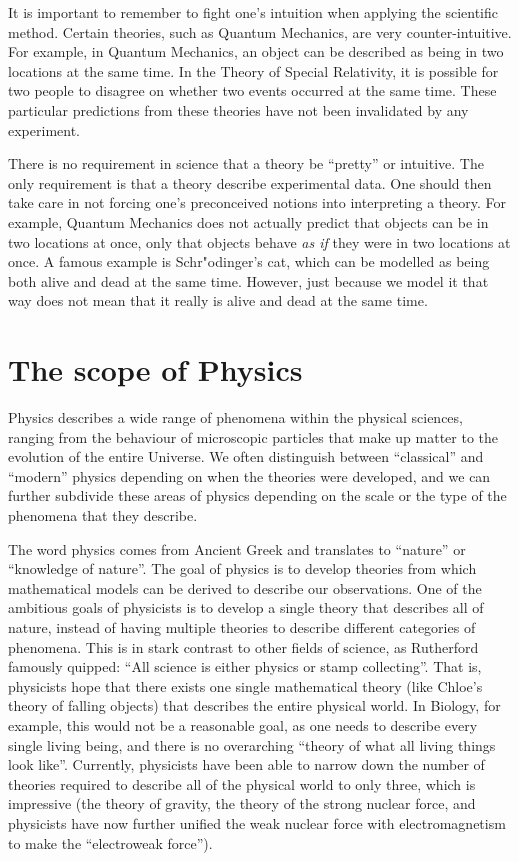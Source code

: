 \documentclass[9pt,Preprint]{lapreprint}
\begin{document}
It is important to remember to fight one's intuition when applying the scientific method. Certain theories, such as Quantum Mechanics, are very counter-intuitive. For example, in Quantum Mechanics, an object can be described as being in two locations at the same time. In the Theory of Special Relativity, it is possible for two people to disagree on whether two events occurred at the same time. These particular predictions from these theories have not been invalidated by any experiment.

There is no requirement in science that a theory be ``pretty'' or intuitive. The only requirement is that a theory describe experimental data. One should then take care in not forcing one's preconceived notions into interpreting a theory. For example, Quantum Mechanics does not actually predict that objects can be in two locations at once, only that objects behave \textit{as if} they were in two locations at once. A famous example is Schr"odinger's cat, which can be modelled as being both alive and dead at the same time. However, just because we model it that way does not mean that it really is alive and dead at the same time.

\section{The scope of Physics}

Physics describes a wide range of phenomena within the physical sciences, ranging from the behaviour of microscopic particles that make up matter to the evolution of the entire Universe. We often distinguish between ``classical'' and ``modern'' physics depending on when the theories were developed, and we can further subdivide these areas of physics depending on the scale or the type of the phenomena that they describe.

The word physics comes from Ancient Greek and translates to ``nature'' or ``knowledge of nature''. The goal of physics is to develop theories from which mathematical models can be derived to describe our observations. One of the ambitious goals of physicists is to develop a single theory that describes all of nature, instead of having multiple theories to describe different categories of phenomena. This is in stark contrast to other fields of science, as Rutherford famously quipped: ``All science is either physics or stamp collecting''. That is, physicists hope that there exists one single mathematical theory (like Chloe's theory of falling objects) that describes the entire physical world. In Biology, for example, this would not be a reasonable goal, as one needs to describe every single living being, and there is no overarching ``theory of what all living things look like''. Currently, physicists have been able to narrow down the number of theories required to describe all of the physical world to only three, which is impressive (the theory of gravity, the theory of the strong nuclear force, and physicists have now further unified the weak nuclear force with electromagnetism to make the ``electroweak force'').
\end{document}
